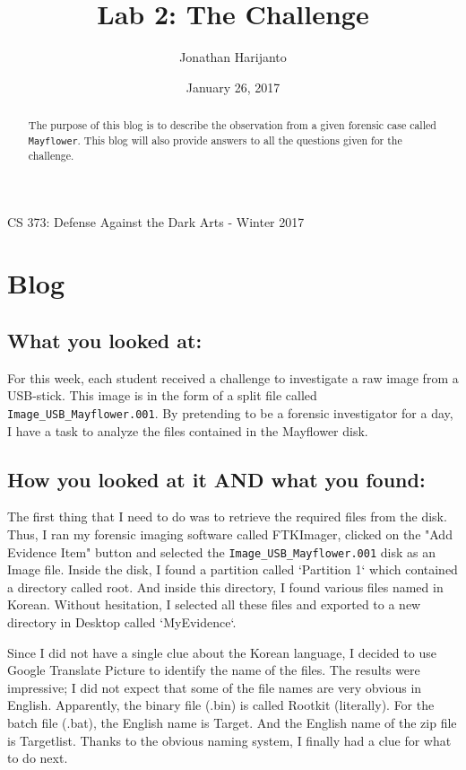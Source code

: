 \documentclass[letterpaper,10pt,titlepage,draftclsnofoot,onecolumn]{IEEEtran}
\title{Lab 2: The Challenge}
\author{Jonathan Harijanto}
\date{January 26, 2017}
\begin{document}
\maketitle
\begin{center}
CS 373: Defense Against the Dark Arts - Winter 2017
\vfill
\end{center}
\begin{abstract}

The purpose of this blog is to describe the observation from a given forensic case called \verb|Mayflower|. 
This blog will also provide answers to all the questions given for the challenge.  
\end{abstract}
\newpage

\section{Blog}

\subsection{What you looked at:}

For this week, each student received a challenge to investigate a raw image from a USB-stick. 
This image is in the form of a split file called \verb|Image_USB_Mayflower.001|.
By pretending to be a forensic investigator for a day, I have a task to analyze the files contained in the Mayflower disk.

\subsection{How you looked at it AND what you found:}
The first thing that I need to do was to retrieve the required files from the disk. 
Thus, I ran my forensic imaging software called FTKImager, clicked on the "Add Evidence Item" button and selected the \verb|Image_USB_Mayflower.001| disk as an Image file.
Inside the disk, I found a partition called `Partition 1` which contained a directory called root. 
And inside this directory, I found various files named in Korean. 
Without hesitation, I selected all these files and exported to a new directory in Desktop called `MyEvidence`.

Since I did not have a single clue about the Korean language, I decided to use Google Translate Picture to identify the name of the files.
The results were impressive; I did not expect that some of the file names are very obvious in English. 
Apparently, the binary file (.bin) is called Rootkit (literally). 
For the batch file (.bat), the English name is Target. 
And the English name of the zip file is Targetlist.
Thanks to the obvious naming system, I finally had a clue for what to do next.
\end{document}
